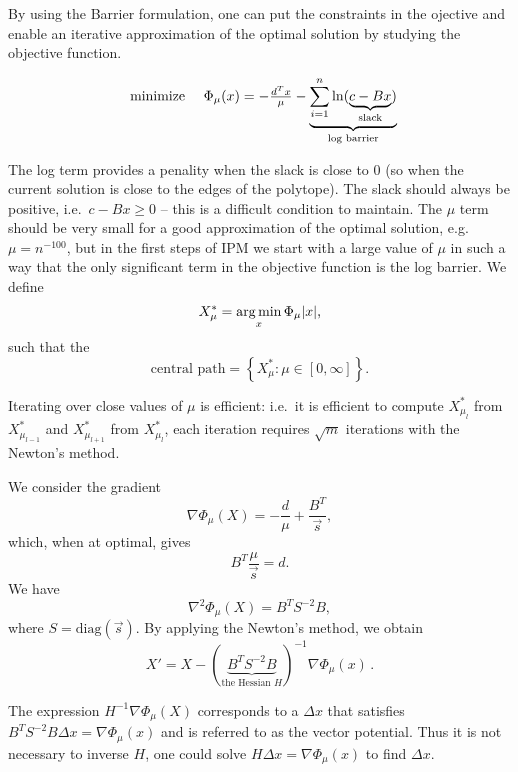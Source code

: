 By using the Barrier formulation, one can put the constraints in the ojective
and enable an iterative approximation of the optimal solution by studying the
objective function.

\begin{equation}
  \begin{array}{ll@{}l}
    \text{minimize } & \Phi_{\mu}(x) = - \frac{d^{T}x}{\mu} - \underbrace{\displaystyle\sum^{n}_{i=1} \ln (\underbrace{c - Bx}_{\text{slack}})}_{\text{log barrier}} \\
  \end{array}
\end{equation}

The log term provides a penality when the slack is close to 0 (so when the
current solution is close to the edges of the polytope). The slack should always
be positive, i.e.\ $c - Bx \geq 0$ -- this is a difficult condition to maintain.
The $\mu$ term should be very small for a good approximation of the optimal
solution, e.g.{} $\mu = n^{-100}$, but in the first steps of IPM we start with a
large value of $\mu$ in such a way that the only significant term in the
objective function is the log barrier. We define $$X_{\mu}^{*} =
\displaystyle\operatorname*{arg\,min}_{x} \Phi_{\mu} \lvert x \rvert \text{,}$$ such that the
$$\text{central path} = \left\{ X_{\mu}^{*}: \mu \in [0,\infty]\right\} \text{.}$$

Iterating over close values of $\mu$ is efficient: i.e.\ it is efficient to
compute $X_{\mu_{l}}^{*}$ from $X_{\mu_{l-1}}^{*}$ and $X_{\mu_{l+1}}^{*}$ from
$X_{\mu_{l}}^{*}$, each iteration requires $\sqrt{m}$ iterations with the Newton's
method.

We consider the gradient
$$\nabla \Phi_{\mu}(X) = - \frac{d}{\mu} + \frac{B^T}{\vec s},$$ which, when at
optimal, gives
$$B^{T}\frac{\mu}{\vec s} = d.$$
We have $$\nabla^{2} \Phi_{\mu}(X) = B^{T}S^{-2}B,$$ where $S =
\mathrm{diag}(\vec s)$. By applying the Newton's method, we obtain
$$X'=X-(\underbrace{B^{T}S^{-2} B}_{\text{the Hessian }H})^{-1}\nabla
\Phi_{\mu}(x) \, .$$

The expression $H^{-1} \nabla \Phi_{\mu}(X)$ corresponds to a $\Delta x$ that
satisfies $B^{T} S^{-2} B \Delta x = \nabla \Phi_{\mu}(x)$ and is referred to as
the vector potential. Thus it is not necessary to inverse $H$, one could solve
$H \Delta x = \nabla \Phi_{\mu}(x)$ to find $\Delta x$.


